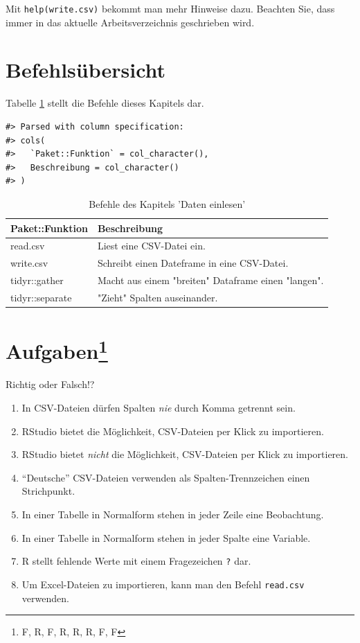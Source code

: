 \documentclass[12pt,ngerman,]{book}
\providecommand{\tightlist}{%
  \setlength{\itemsep}{0pt}\setlength{\parskip}{0pt}}
\let\rmarkdownfootnote\footnote%
\def\footnote{\protect\rmarkdownfootnote}
\let\BeginKnitrBlock\begin \let\EndKnitrBlock\end
\begin{document}
Mit \texttt{help(write.csv)} bekommt man mehr Hinweise dazu. Beachten
Sie, dass immer in das aktuelle Arbeitsverzeichnis geschrieben wird.

\section{Befehlsübersicht}\label{befehlsubersicht-1}

Tabelle \ref{tab:befehle-tidy} stellt die Befehle dieses Kapitels dar.

\begin{verbatim}
#> Parsed with column specification:
#> cols(
#>   `Paket::Funktion` = col_character(),
#>   Beschreibung = col_character()
#> )
\end{verbatim}

\begin{table}

\caption{\label{tab:befehle-tidy}Befehle des Kapitels 'Daten einlesen'}
\centering
\begin{tabular}[t]{l|l}
\hline
Paket::Funktion & Beschreibung\\
\hline
read.csv & Liest eine CSV-Datei ein.\\
\hline
write.csv & Schreibt einen Dateframe in eine CSV-Datei.\\
\hline
tidyr::gather & Macht aus einem "breiten" Dataframe einen "langen".\\
\hline
tidyr::separate & "Zieht" Spalten auseinander.\\
\hline
\end{tabular}
\end{table}

\section[Aufgaben]{\texorpdfstring{Aufgaben\footnote{F, R, F, R, R, R,
  F, F}}{Aufgaben}}\label{aufgaben-2}

\BeginKnitrBlock{rmdexercises}
Richtig oder Falsch!?

\begin{enumerate}
\def\labelenumi{\arabic{enumi}.}
\tightlist
\item
  In CSV-Dateien dürfen Spalten \emph{nie} durch Komma getrennt sein.
\item
  RStudio bietet die Möglichkeit, CSV-Dateien per Klick zu importieren.
\item
  RStudio bietet \emph{nicht} die Möglichkeit, CSV-Dateien per Klick zu
  importieren.
\item
  ``Deutsche'' CSV-Dateien verwenden als Spalten-Trennzeichen einen
  Strichpunkt.
\item
  In einer Tabelle in Normalform stehen in jeder Zeile eine Beobachtung.
\item
  In einer Tabelle in Normalform stehen in jeder Spalte eine Variable.
\item
  R stellt fehlende Werte mit einem Fragezeichen \texttt{?} dar.
\item
  Um Excel-Dateien zu importieren, kann man den Befehl \texttt{read.csv}
  verwenden.
\end{enumerate}
\EndKnitrBlock{rmdexercises}
\end{document}
